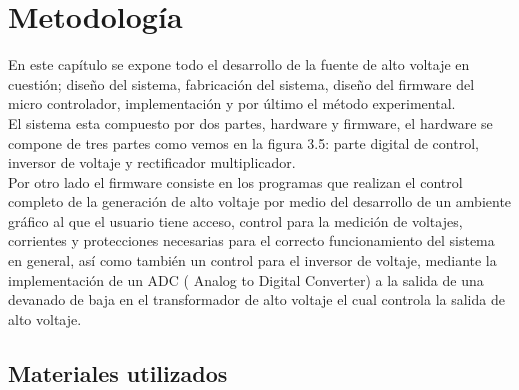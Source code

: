 



\chapter{Metodología}
En este capítulo se expone todo el desarrollo de la fuente de alto voltaje en cuestión; diseño del sistema, fabricación del sistema, diseño del firmware del micro controlador, implementación y por último el método experimental.\\

El sistema esta compuesto por dos partes, hardware y firmware, el hardware se compone de tres partes como vemos en la figura 3.5: parte digital de control, inversor de voltaje y rectificador multiplicador. \\

Por otro lado el firmware consiste en los programas que realizan el control completo de la generación de alto voltaje por medio del desarrollo de un ambiente gráfico al que el usuario tiene acceso,  control para la medición de voltajes, corrientes y protecciones necesarias para el correcto funcionamiento del sistema en general, así como también un control para el inversor de voltaje, mediante la implementación de un ADC ( Analog to Digital Converter) a la salida de una devanado de baja en el transformador de alto voltaje el cual controla la salida de alto voltaje.
\newpage





\section{Materiales utilizados}

